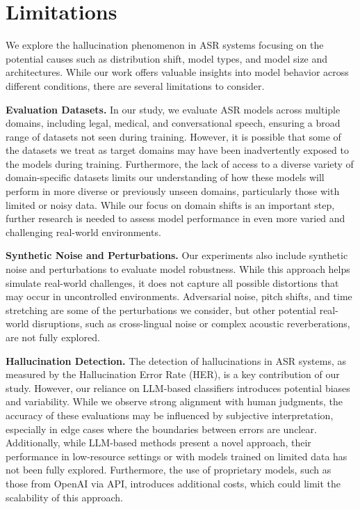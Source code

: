 \section{Limitations}\label{sec:limitations}
We explore the hallucination phenomenon in ASR systems focusing on the potential causes such as distribution shift, model types, and model size and architectures. While our work offers valuable insights into model behavior across different conditions, there are several limitations to consider.


\noindent\textbf{Evaluation Datasets.} 
In our study, we evaluate ASR models across multiple domains, including legal, medical, and conversational speech, ensuring a broad range of datasets not seen during training. However, it is possible that some of the datasets we treat as target domains may have been inadvertently
 exposed to the models during training. Furthermore, the lack of access to a diverse variety of domain-specific datasets limits our understanding of how these models will perform in more diverse or previously unseen domains, particularly those with limited or noisy data. While our focus on domain shifts is an important step, further research is needed to assess model performance in even more varied and challenging real-world environments.


\noindent\textbf{Synthetic Noise and Perturbations.}
Our experiments also include synthetic noise and perturbations to evaluate model robustness. While this approach helps simulate real-world challenges, it does not capture all possible distortions that may occur in uncontrolled environments. Adversarial noise, pitch shifts, and time stretching are some of the perturbations we consider, but other potential real-world disruptions, such as cross-lingual noise or complex acoustic reverberations, are not fully explored.

\noindent\textbf{Hallucination Detection.} 
The detection of hallucinations in ASR systems, as measured by the Hallucination Error Rate (HER), is a key contribution of our study. However, our reliance on LLM-based classifiers introduces potential biases and variability. While we observe strong alignment with human judgments, the accuracy of these evaluations may be influenced by subjective interpretation, especially in edge cases where the boundaries between errors are unclear. Additionally, while LLM-based methods present a novel approach, their performance in low-resource settings or with models trained on limited data has not been fully explored. Furthermore, the use of proprietary models, such as those from OpenAI via API, introduces additional costs, which could limit the scalability of this approach.
